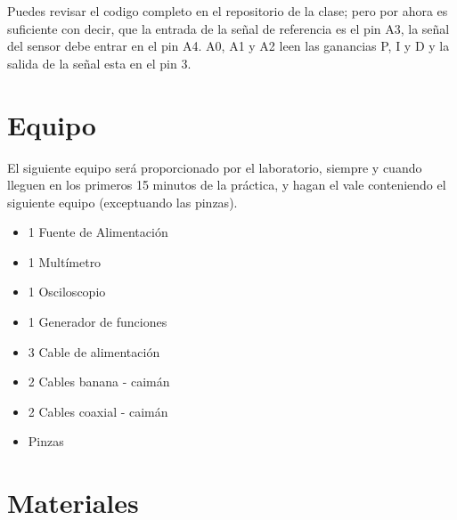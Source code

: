 		Puedes revisar el codigo completo en el repositorio de la clase; pero por ahora es suficiente con decir, que la entrada de la señal de referencia es el pin A3, la señal del sensor debe entrar en el pin A4. A0, A1 y A2 leen las ganancias P, I y D y la salida de la señal esta en el pin 3.

\section{Equipo}

	El siguiente equipo será proporcionado por el laboratorio, siempre y cuando lleguen en los primeros 15 minutos de la práctica, y hagan el vale conteniendo el siguiente equipo (exceptuando las pinzas).

	\begin{itemize}
		\item 1 Fuente de Alimentación
		\item 1 Multímetro
		\item 1 Osciloscopio
		\item 1 Generador de funciones
		\item 3 Cable de alimentación
		\item 2 Cables banana - caimán
		\item 2 Cables coaxial - caimán
		\item Pinzas
	\end{itemize}


\section{Materiales}

